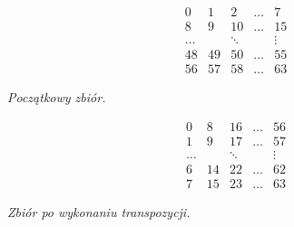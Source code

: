 \documentclass[a4paper]{article}
\theoremstyle{definition}
\begin{document}
\vspace{0.5em}

\begin{minipage}{.5\textwidth} %

\[
\begin{matrix}
 0 &  1 &  2 &  \ldots & 7 \\
 8 &  9 & 10 &  \ldots & 15 \\
\ldots & & \ddots &  & \vdots \\
48 & 49 & 50 & \ldots & 55 \\
56 & 57 & 58 & \ldots & 63 
\end{matrix}
\]

\begin{center} \it
    Początkowy zbiór.
\end{center}

\end{minipage} %
\begin{minipage}{.5\textwidth} %

\[
\begin{matrix}
 0 &  8 &  16 &  \ldots & 56 \\
 1 &  9 &  17 &  \ldots & 57 \\
\ldots  & & \ddots &     & \vdots \\
 6 & 14 & 22 & \ldots   & 62 \\
 7 & 15 & 23 & \ldots   & 63 
\end{matrix}
\]

\begin{center} \it
    Zbiór po wykonaniu transpozycji.
\end{center}
\end{minipage}

\vspace{0.5em}
\end{document}

